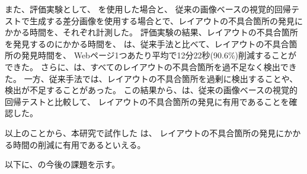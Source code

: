 \par
また、評価実験として、
\toolName を使用した場合と、
従来の画像ベースの視覚的回帰テストで生成する差分画像を使用する場合とで、レイアウトの不具合箇所の発見にかかる時間を、それぞれ計測した。
評価実験の結果、レイアウトの不具合箇所を発見するのにかかる時間を、
\toolName は、従来手法と比べて、レイアウトの不具合箇所の発見時間を、
Webページ1つあたり平均で12分22秒(90.6\%)削減することができた。
さらに、\toolName は、すべてのレイアウトの不具合箇所を過不足なく検出できた。
一方、従来手法では、レイアウトの不具合箇所を過剰に検出することや、検出が不足することがあった。
この結果から、\toolName は、従来の画像ベースの視覚的回帰テストと比較して、
レイアウトの不具合箇所の発見に有用であることを確認した。
\par
以上のことから、本研究で試作した \toolName は、
レイアウトの不具合箇所の発見にかかる時間の削減に有用であるといえる。
\par
以下に、\toolName の今後の課題を示す。
